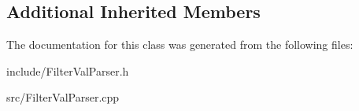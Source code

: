 \subsection*{Additional Inherited Members}


The documentation for this class was generated from the following files\+:\begin{DoxyCompactItemize}
\item 
include/Filter\+Val\+Parser.\+h\item 
src/Filter\+Val\+Parser.\+cpp\end{DoxyCompactItemize}
